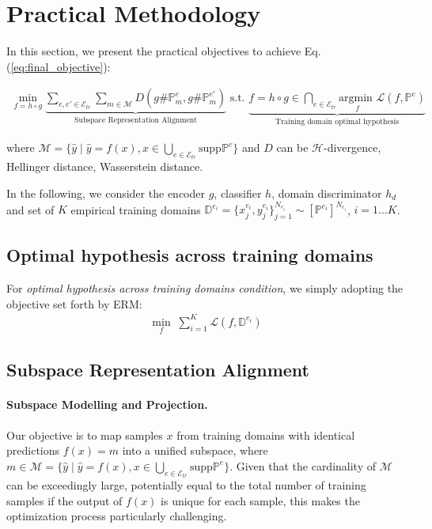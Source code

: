 
\section{Practical Methodology}
\label{Sec:practical}
In this section, we present the practical objectives to achieve Eq. (\ref{eq:final_objective}):

\begin{align}
\min_{f=h\circ g} \underset{\text{Subspace Representation Alignment}}{\underbrace{\sum_{e,e'\in \mathcal{E}_{tr}}\sum_{m\in \mathcal{M}}D\left( g\#\mathbb{P}_m^{e},g\#\mathbb{P}_m^{e'}\right)}}\text{ s.t. } \underset{\text{Training domain optimal hypothesis}}{\underbrace{f=h\circ g\in \bigcap_{e\in \mathcal{E}_{tr}}\underset{ f}{\text{argmin }} \mathcal{L}\left(f,\mathbb{P}^{e}\right)}}
   \label{eq:final_objective_apd}
\end{align}

where $\mathcal{M}=\{\hat{y}\mid \hat{y}=f(x), x\in\bigcup_{e\in\mathcal{E}_{tr}}\text{supp}\mathbb{P}^{e} \}$ and $D$ can be $\mathcal{H}$-divergence, Hellinger distance, Wasserstein distance.

In the following, we consider the encoder $g$, classifier $h$, domain discriminator $h_d$ and set of $K$ empirical training domains $\mathbb{D}^{e_i}=\{x_{j}^{e_i},y_{j}^{e_i}\}_{j=1}^{N_{e_i}}\sim [\mathbb{P}^{e_i} ]^{N_{e_i}}$, $i=1...K$.


\subsection{Optimal hypothesis across training domains}
For \textit{optimal hypothesis across training domains condition}, we simply adopting the objective set forth by ERM: 
\begin{align}
\label{eq:emp_IRM}
     \min_{f} \; \sum_{i=1}^K \mathcal{L}\left(f,\mathbb{D}^{e_i}\right)
\end{align} 


\subsection{Subspace Representation Alignment}
\paragraph{Subspace Modelling and Projection.} 
\label{sec:subspace_project_detail}
Our objective is to map samples $x$ from training domains with identical predictions $f(x) = m$ into a unified subspace, where $m\in \mathcal{M}=\{\hat{y}\mid \hat{y}=f(x), x\in\bigcup_{e\in\mathcal{E}_{tr}}\text{supp}\mathbb{P}^{e} \}$. Given that the cardinality of $\mathcal{M}$ can be exceedingly large, potentially equal to the total number of training samples if the output of $f(x)$ is unique for each sample, this makes the optimization process particularly challenging.

